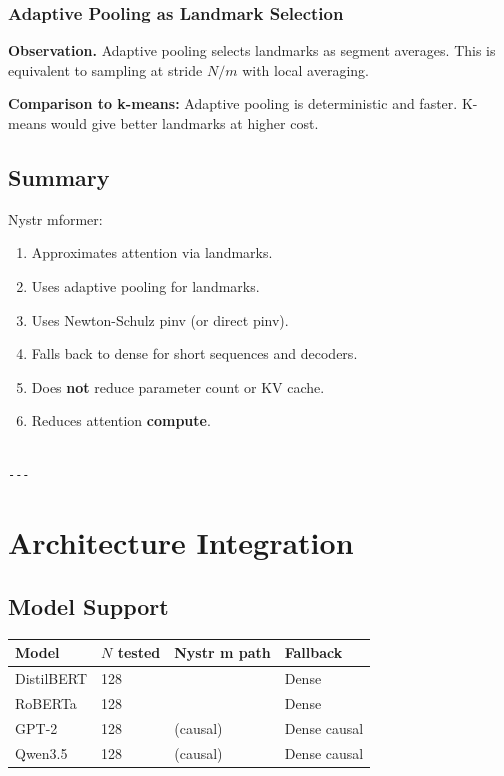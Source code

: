 \subsubsection{Adaptive Pooling as Landmark Selection}

\textbf{Observation.} Adaptive pooling selects landmarks as segment averages. 
This is equivalent to sampling at stride $N / m$ with local averaging.

\textbf{Comparison to k-means:} Adaptive pooling is deterministic and faster. 
K-means would give better landmarks at higher cost.

\subsection{Summary}

Nystr mformer:
\begin{enumerate}
\item Approximates attention via landmarks.
\item Uses adaptive pooling for landmarks.
\item Uses Newton-Schulz pinv (or direct pinv).
\item Falls back to dense for short sequences and decoders.
\item Does \textbf{not} reduce parameter count or KV cache.
\item Reduces attention \textbf{compute}.
\end{enumerate}
\begin{lstlisting}

---
\end{lstlisting}


\section{Architecture Integration}

\subsection{Model Support}

\begin{table}[H]
\centering
\small
\begin{tabular}{llll}
\toprule
\textbf{Model} & \textbf{$N$ tested} & \textbf{Nystr m path} & \textbf{Fallback} \\
\midrule
DistilBERT & 128 &  & Dense \\
RoBERTa & 128 &  & Dense \\
GPT-2 & 128 & (causal) & Dense causal \\
Qwen3.5 & 128 & (causal) & Dense causal \\
\bottomrule
\end{tabular}
\end{table}


